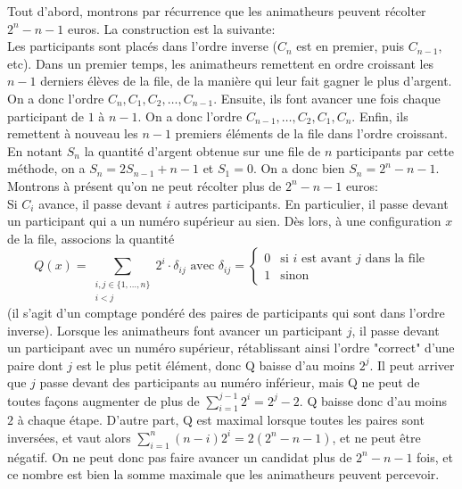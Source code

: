 \begin{sol}
Tout d'abord, montrons par récurrence que les animatheurs peuvent récolter $2^n-n-1$ euros. La construction est la suivante:\\
Les participants sont placés dans l'ordre inverse ($C_n$ est en premier, puis $C_{n-1}$, etc). Dans un premier temps, les animatheurs remettent en ordre croissant les $n-1$ derniers élèves de la file, de la manière qui leur fait gagner le plus d'argent. On a donc l'ordre $C_n, C_1, C_2,\ldots, C_{n-1}$. Ensuite, ils font avancer une fois chaque participant de $1$ à $n-1$. On a donc l'ordre $C_{n-1},\ldots, C_2, C_1, C_n$. Enfin, ils remettent à nouveau les $n-1$ premiers éléments de la file dans l'ordre croissant. En notant $S_n$ la quantité d'argent obtenue sur une file de $n$ participants par cette méthode, on a $S_n=2S_{n-1}+n-1$ et $S_1=0$. On a donc bien $S_n=2^n-n-1$.\\
Montrons à présent qu'on ne peut récolter plus de $2^n-n-1$ euros:\\
Si $C_i$ avance, il passe devant $i$ autres participants. En particulier, il passe devant un participant qui a un numéro supérieur au sien. Dès lors, à une configuration $x$ de la file, associons la quantité
\begin{equation*}
Q(x)=\sum_{\substack{i,j\in\{1,\ldots, n\}\\ i<j}}2^i\cdot\delta_{ij} \textrm{ avec } \delta_{ij}=
\begin{cases}
0 & \textrm{si $i$ est avant $j$ dans la file}\\
1 & \textrm{sinon}
\end{cases}
\end{equation*}
(il s'agit d'un comptage pondéré des paires de participants qui sont dans l'ordre inverse). Lorsque les animatheurs font avancer un participant $j$, il passe devant un participant avec un numéro supérieur, rétablissant ainsi l'ordre "correct" d'une paire dont $j$ est le plus petit élément, donc Q baisse d'au moins $2^j$. Il peut arriver que $j$ passe devant des participants au numéro inférieur, mais Q ne peut de toutes façons augmenter de plus de $\sum_{i=1}^{j-1} 2^i=2^j-2$. Q baisse donc d'au moins $2$ à chaque étape. D'autre part, Q est maximal lorsque toutes les paires sont inversées, et vaut alors $\sum_{i=1}^n (n-i)2^i=2(2^n-n-1)$, et ne peut être négatif. On ne peut donc pas faire avancer un candidat plus de $2^n-n-1$ fois, et ce nombre est bien la somme maximale que les animatheurs peuvent percevoir.
\end{sol}

